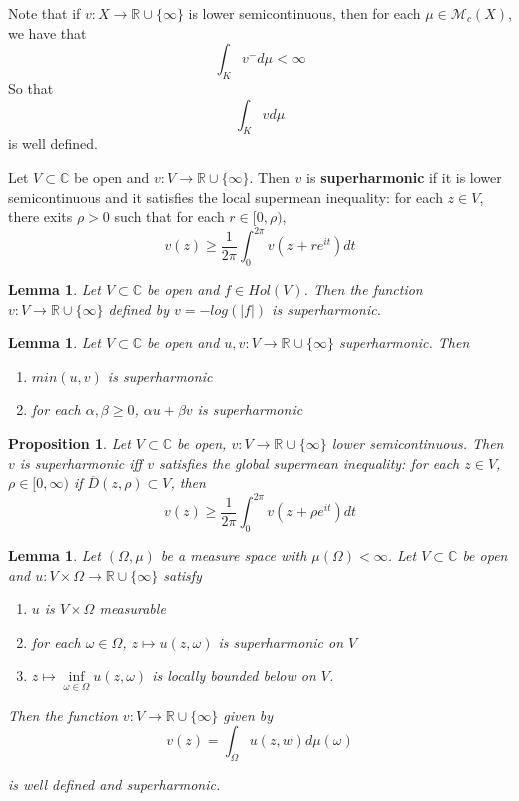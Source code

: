 \documentclass[12pt]{amsart}
\newtheorem{lem}[thm]{Lemma}
\newtheorem{prop}[thm]{Proposition}
\theoremstyle{definition}
\theoremstyle{remark}
\theoremstyle{definition}
\newcommand{\C}{\mathbb{C}}
\newcommand{\MCM}{\mathcal{M}}
\newcommand{\RR}{\mathbb{R} \cup \{\infty\}}
\begin{document}
Note that if $v:X \rightarrow \RR$ is lower semicontinuous, then for each $\mu \in \MCM_c(X)$, we have that $$\int_{K}v^-d \mu < \infty$$ So that $$\int_{K}vd\mu$$ is well defined.

Let $V \subset \C$ be open and $v:V \rightarrow \RR$. Then $v$ is \textbf{superharmonic} if it is lower semicontinuous and it satisfies the local supermean inequality: for each $z \in V $, there exits $\rho > 0$
such that for each $r \in [0,\rho)$, $$v(z) \geq\frac{1}{2\pi}\int_0^{2\pi}v(z + re^{it})dt$$

\begin{lem}

Let $V \subset \C$ be open and $f \in Hol(V)$. Then the function $v:V \rightarrow \RR$ defined by $v = -log(|f|)$ is superharmonic.

\end{lem}

\begin{lem}

Let $V \subset \C$ be open and $u,v : V \rightarrow \RR$ superharmonic. Then 

\begin{enumerate}
\item $min(u,v)$ is superharmonic
\item for each $\alpha, \beta \geq 0$, $\alpha u + \beta v $ is superharmonic
\end{enumerate}

\end{lem}

\begin{prop}

Let $V \subset \C$ be open, $v:V \rightarrow \RR$ lower semicontinuous. Then $v$ is superharmonic iff $v$ satisfies the global supermean inequality: for each $z \in V$, $\rho \in [0,\infty)$ if $\overline{D}(z,\rho) \subset V$, then $$v(z) \geq \frac{1}{2\pi}\int_0^{2\pi}v(z + \rho e^{it})dt$$

\end{prop}

\begin{lem}

Let $(\Omega, \mu)$ be a measure space with $\mu(\Omega) < \infty$. Let $V \subset \C$ be open and $u: V \times \Omega \rightarrow \RR$ satisfy 

\begin{enumerate}
\item $u$ is $V\times\Omega$ measurable
\item for each $\omega \in \Omega$, $z \mapsto u(z,\omega)$ is superharmonic on $V$
\item $z \mapsto \inf\limits_{\omega \in \Omega}u(z,\omega)$ is locally bounded below on $V$.   
\end{enumerate}

Then the function $v:V \rightarrow \RR$ given by $$v(z)= \int_{\Omega}u(z,w)d\mu(\omega)$$ 

is well defined and superharmonic.  

\end{lem}
\end{document}
